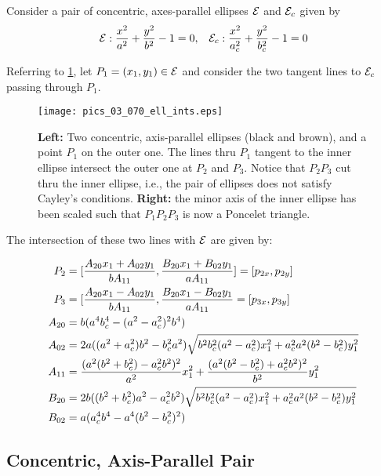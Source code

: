 Consider a pair of concentric, axes-parallel ellipses $\mathcal{E}$ and $\mathcal{E}_c$ given by
\[ \mathcal{E}:\frac{x^2}{a^2}+\frac{y^2}{b^2}-1=0,\;\;\;\mathcal{E}_c:\frac{x^2}{a_c^2}+\frac{y^2}{b_c^2}-1=0\]

Referring to \cref{fig:ell-ints}, let $P_1=(x_1,y_1)\in \mathcal{E}$ and consider the two tangent lines to $\mathcal{E}_c$ passing through $P_1$.

\begin{figure}
    \centering
    \texttt{[image: pics\_03\_070\_ell\_ints.eps]}
    \caption{\textbf{Left:} Two concentric, axis-parallel ellipses (black and brown), and a point $P_1$ on the outer one. The lines thru $P_1$ tangent to the inner ellipse intersect the outer one at $P_2$ and $P_3$. Notice that $P_2 P_3$ cut thru the inner ellipse, i.e., the pair of ellipses does not satisfy Cayley's conditions. \textbf{Right:} the minor axis of the inner ellipse has been scaled such that $P_1 P_2 P_3$ is now a Poncelet triangle.}
    \label{fig:ell-ints}
\end{figure}

The intersection of these two lines with $\mathcal{E}$ are given by:

\begin{equation}\aligned
    P_2& =[\frac{A_{20} x_1 + A_{02} y_1}{b A_{11}} ,  \frac{B_{20} x_1 + B_{02} y_1}{a A_{11}} ]=[p_{2x},p_{2y}]\\
    P_3&=[\frac{A_{20} x_1 - A_{02} y_1}{b A_{11}},\frac{B_{20} x_1 - B_{02} y_1}{a A_{11}}=[p_{3x},p_{3y}]\\
    A_{20}&=b(a^4  b_c^4 -(a^2 -  a_c^2)^2 b^4  ) \\
    A_{02}&= 2 a ( (a^2 + a_c^2)b^2 - b_c^2a^2) \sqrt{ b^2  b_c^2 (a^2 -  a_c^2)  x_1^2 +  a_c^2 a^2 (b^2 -  b_c^2)  y_1^2 }\\
    A_{11}&=\frac{(a^2 (b^2 +  b_c^2) - a_c^2 b^2)^2 }{a^2 }x_1^2+ \frac{(a^2 (b^2 -  b_c^2) + a_c^2b^2)^2 }{b^2}y_1^2\\
    B_{20}&=2b( (b^2 +  b_c^2) a^2 -    a_c^2 b^2) \sqrt{ b^2  b_c^2 (a^2 -  a_c^2)  x_1^2 +  a_c^2 a^2(b^2 -  b_c^2)  y_1^2} \\
    B_{02}&= a(a_c^4b^4-a^4(b^2-b_c^2)^2)
    \label{eq:chap3_orb3}
\endaligned
\end{equation}

\subsection{Concentric, Axis-Parallel Pair}

